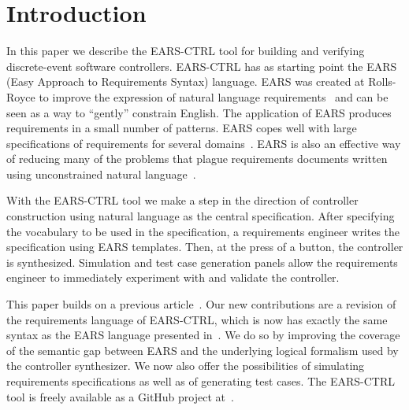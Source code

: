 \section{Introduction}
In this paper we describe the \textsf{EARS-CTRL} tool for
building and verifying discrete-event software controllers. \textsf{EARS-CTRL} has as starting point
the EARS (Easy Approach to Requirements Syntax) language. EARS was created at Rolls-Royce to
improve the expression of natural language requirements~\cite{EARS09} and can be
seen as a way to ``gently'' constrain English. The application of EARS produces
requirements in a small number of patterns. EARS copes well with large
specifications of requirements for several domains~\cite{EARS10,EARS16}. EARS is
also an effective way of reducing many of the problems that plague requirements
documents written using unconstrained natural language~\cite{EARS09}.

With the \textsf{EARS-CTRL} tool we make a step in the direction of controller
construction using natural language as the central specification.
After specifying the vocabulary to be used in the specification, a requirements
engineer writes the specification using EARS templates. Then, at the press of a
button, the controller is synthesized. Simulation and test case
generation panels allow the requirements engineer to immediately
experiment with and validate the controller.

This paper builds on a previous article~\cite{LucioRCM17}.
Our new contributions are a revision of the requirements language of
\textsf{EARS-CTRL}, which is now has exactly the same syntax as the EARS
language presented in~\cite{EARS09}. We do so by improving the coverage of the
semantic gap between EARS and the underlying logical formalism used by the controller synthesizer. We now also offer the
possibilities of simulating requirements specifications as well as of generating test cases.
The \textsf{EARS-CTRL} tool is freely available as a GitHub project 
at~\cite{EARSProject}.

% 


